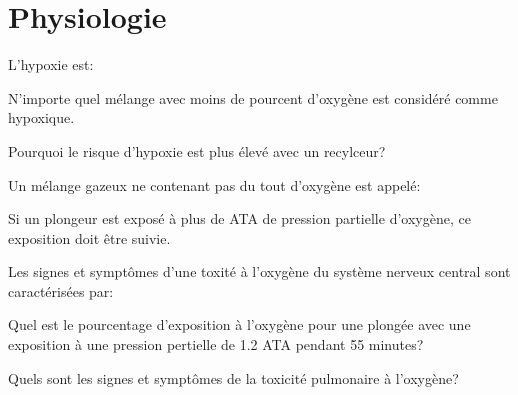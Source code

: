 \documentclass[english,12pt,a4paper]{article}
\begin{document}
	\section{Physiologie}
	\begin{outline}
		\1 L'hypoxie est:
			\2[] \hspace{-2em}\hrulefill
			\2[] \hspace{-2em}\hrulefill
			
		\1 N'importe quel mélange avec moins de \underline{\hspace{1.5cm}} pourcent d'oxygène est considéré comme hypoxique.

		\1 Pourquoi le risque d'hypoxie est plus élevé avec un recylceur?
			\2[] \hspace{-2em}\hrulefill
			\2[] \hspace{-2em}\hrulefill
			\2[] \hspace{-2em}\hrulefill

		\1 Un mélange gazeux ne contenant pas du tout d'oxygène est appelé:
			\2[] \hspace{-2em}\hrulefill

		\1 Si un plongeur est exposé à plus de \underline{\hspace{1.5cm}} ATA de pression partielle d'oxygène, ce exposition doit être suivie.

		\1 Les signes et symptômes d'une toxité à l'oxygène du système nerveux central sont caractérisées par:
			\2[] \hspace{-2em}\hrulefill
			\2[] \hspace{-2em}\hrulefill
			\2[] \hspace{-2em}\hrulefill
			\2[] \hspace{-2em}\hrulefill
			\2[] \hspace{-2em}\hrulefill
			\2[] \hspace{-2em}\hrulefill
			\2[] \hspace{-2em}\hrulefill

		\1 Quel est le pourcentage d'exposition à l'oxygène pour une plongée avec une exposition à une pression pertielle de 1.2 ATA pendant 55 minutes?
			\2[] \hspace{-2em}\hrulefill
			\2[] \hspace{-2em}\hrulefill

		\1 Quels sont les signes et symptômes de la toxicité pulmonaire à l'oxygène?
			\2[] \hspace{-2em}\hrulefill
			\2[] \hspace{-2em}\hrulefill


\end{outline}
\end{document}
